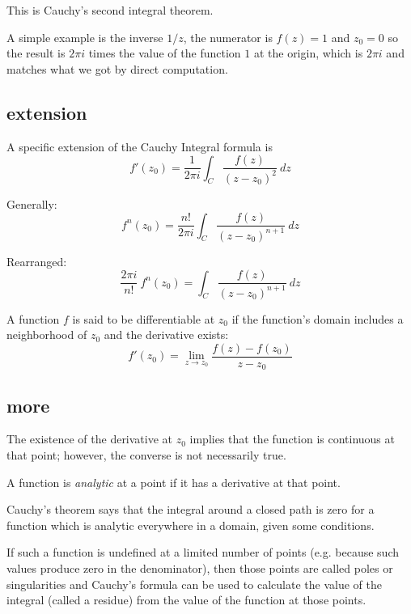 \documentclass[11pt, oneside]{article}
\begin{document}
This is Cauchy's second integral theorem.

A simple example is the inverse $1/z$, the numerator is $f(z) = 1$ and $z_0 = 0$ so the result is $2 \pi i$ times the value of the function $1$ at the origin, which is $2 \pi i$ and matches what we got by direct computation.

\subsection*{extension}

A specific extension of the Cauchy Integral formula is
\[ f'(z_0) = \frac{1}{2 \pi i} \int_C \frac{f(z)}{(z - z_0)^2} \ dz \]

Generally:
\[ f^n(z_0) = \frac{n!}{2 \pi i} \int_C \frac{f(z)}{(z - z_0)^{n+1}} \ dz \]

Rearranged:
\[ \frac{2 \pi i}{n!} \ f^n(z_0) = \int_C \frac{f(z)}{(z - z_0)^{n+1}} \ dz \]

A function $f$ is said to be differentiable at $z_0$ if the function's domain includes a neighborhood of $z_0$ and the derivative exists:
\[ f'(z_0) = \lim_{z \rightarrow z_0} \frac{f(z) - f(z_0)}{z - z_0} \]

\subsection*{more}

The existence of the derivative at $z_0$ implies that the function is continuous at that point;  however, the converse is not necessarily true.

A function is \emph{analytic} at a point if it has a derivative at that point.

Cauchy's theorem says that the integral around a closed path is zero for a function which is analytic everywhere in a domain, given some conditions.

If such a function is undefined at a limited number of points (e.g. because such values produce zero in the denominator), then those points are called poles or singularities and Cauchy's formula can be used to calculate the value of the integral (called a residue) from the value of the function at those points.
\end{document}

